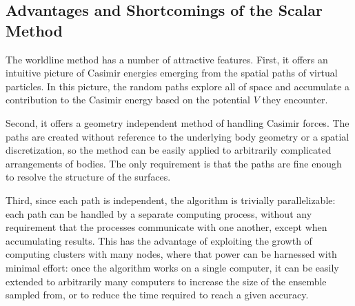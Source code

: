 
\subsection[Advantages and Shortcomings of the Scalar \\ Method]{Advantages and Shortcomings of the Scalar Method}

The worldline method has a number of attractive features.  
First, it offers an intuitive picture of Casimir energies emerging from the spatial paths 
of virtual particles.   In this picture, the random paths explore all of space
and accumulate a contribution to the Casimir energy based on the potential $V$ they encounter.

Second, it offers a geometry independent method of handling Casimir forces.  The paths are 
created without reference to the underlying body geometry or a spatial discretization, so the method can be easily applied to arbitrarily
complicated arrangements of bodies.  The only requirement is that the paths are fine enough
to resolve the structure of the surfaces.  

Third, since each path is independent, the algorithm is trivially parallelizable: each path
can be handled by a separate computing process, without any requirement that the processes communicate
with one another, except when accumulating results.  This has the advantage of exploiting the growth of computing clusters with many nodes,
where that power can be harnessed with minimal effort: once the algorithm works on a single computer,
it can be easily extended to arbitrarily many computers to increase the size of the ensemble sampled
from, or to reduce the time required to reach a given accuracy.  



